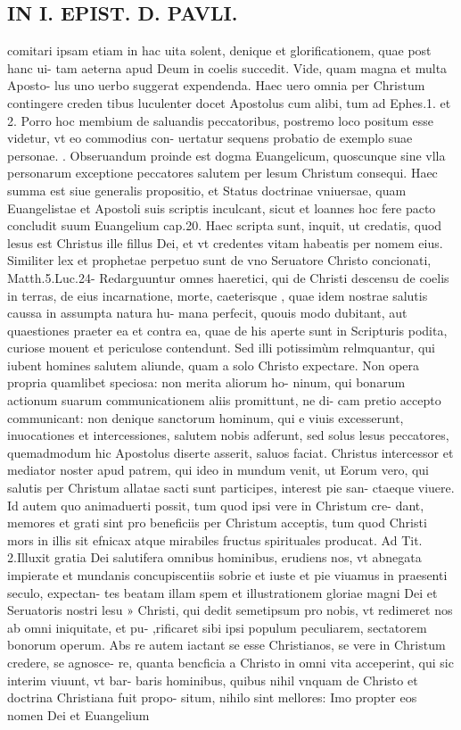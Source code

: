 \documentclass{article}
\begin{document}
\begin{pages}
\section*{IN I. EPIST. D. PAVLI. }
\marginpar{[ p.51 ]}\pstart comitari ipsam etiam in hac uita solent, denique et glorificationem, quae post hanc ui- tam aeterna apud Deum in coelis succedit. Vide, quam magna et multa Aposto- lus uno uerbo suggerat expendenda. Haec uero omnia per Christum contingere creden tibus luculenter docet Apostolus cum alibi, tum ad Ephes.1. et 2. Porro hoc membium de saluandis peccatoribus, postremo loco positum esse videtur, vt eo commodius con- uertatur sequens probatio de exemplo suae personae.  \pend{}. Obseruandum proinde est dogma Euangelicum, quoscunque  sine vlla personarum exceptione peccatores salutem per lesum Christum consequi. Haec summa est siue generalis propositio, et Status doctrinae vniuersae, quam Euangelistae et Apostoli suis scriptis inculcant, sicut et loannes hoc fere pacto concludit suum Euangelium cap.20. Haec scripta sunt, inquit, ut credatis, quod lesus est Christus ille fillus Dei, et vt credentes vitam habeatis per nomem eius. Similiter lex et prophetae perpetuo sunt de vno Seruatore Christo concionati, Matth.5.Luc.24-  \pend{} Redarguuntur omnes haeretici, qui de Christi descensu de coelis in terras, de eius incarnatione, morte, caeterisque , quae idem nostrae salutis caussa in assumpta natura hu- mana perfecit, quouis modo dubitant, aut quaestiones praeter ea et contra ea, quae de his aperte sunt in Scripturis podita, curiose mouent et periculose contendunt. Sed illi potissimùm relmquantur, qui iubent homines salutem aliunde, quam a solo Christo expectare. Non opera propria quamlibet speciosa: non merita aliorum ho- ninum, qui bonarum actionum suarum communicationem aliis promittunt, ne di- cam pretio accepto communicant: non denique sanctorum hominum, qui e viuis excesserunt, inuocationes et intercessiones, salutem nobis adferunt, sed solus lesus peccatores, quemadmodum hic Apostolus diserte asserit, saluos faciat. Christus intercessor et mediator noster apud patrem, qui ideo in mundum venit, ut  \pend\pstart Eorum vero, qui salutis per Christum allatae sacti sunt participes, interest pie san- ctaeque  viuere. Id autem quo animaduerti possit, tum quod ipsi vere in Christum cre- dant, memores et grati sint pro beneficiis per Christum acceptis, tum quod Christi mors in illis sit efnicax atque mirabiles fructus spirituales producat. Ad Tit. 2.Illuxit gratia Dei salutifera omnibus hominibus, erudiens nos, vt abnegata impierate et mundanis concupiscentiis sobrie et iuste et pie viuamus in praesenti seculo, expectan-   tes beatam illam spem et illustrationem gloriae magni Dei et Seruatoris nostri lesu » Christi, qui dedit semetipsum pro nobis, vt redimeret nos ab omni iniquitate, et pu- ,rificaret sibi ipsi populum peculiarem, sectatorem bonorum operum.  \pend\pstart Abs re autem iactant se esse Christianos, se vere in Christum credere, se agnosce- re, quanta bencficia a Christo in omni vita acceperint, qui sic interim viuunt, vt bar- baris hominibus, quibus nihil vnquam de Christo et doctrina Christiana fuit propo- situm, nihilo sint mellores: Imo propter eos nomen Dei et Euangelium 
\end{pages}
\end{document}

